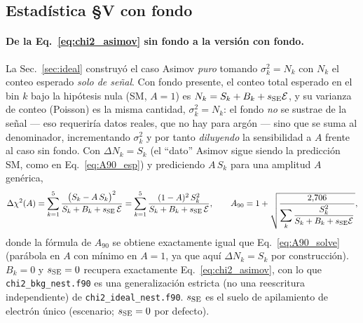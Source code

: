 \documentclass[11pt,a4paper]{article}
\newcommand{\code}[1]{\texttt{#1}}
\begin{document}
\subsection{Estad\'istica \S V con fondo}
\label{sec:ar_chi2}

\paragraph{De la Eq.~\eqref{eq:chi2_asimov} sin fondo a la versi\'on con fondo.}
La Sec.~\ref{sec:ideal} construy\'o el caso Asimov \emph{puro} tomando
$\sigma_{k}^{2}=N_{k}$ con $N_{k}$ el conteo esperado \emph{solo de se\~nal}. Con
fondo presente, el conteo total esperado en el bin $k$ bajo la hip\'otesis nula
(SM, $A=1$) es $N_{k}=S_{k}+B_{k}+s_{\rm SE}\mathcal{E}$, y su varianza de
conteo (Poisson) es la misma cantidad, $\sigma_{k}^{2}=N_{k}$: el fondo
\emph{no} se sustrae de la se\~nal --- eso requerir\'ia datos reales, que no hay
para arg\'on --- sino que se suma al denominador, incrementando $\sigma_{k}^{2}$
y por tanto \emph{diluyendo} la sensibilidad a $A$ frente al caso sin fondo. Con
$\Delta N_{k}=S_{k}$ (el ``dato'' Asimov sigue siendo la predicci\'on SM, como en
Eq.~\eqref{eq:A90_esp}) y prediciendo $A\,S_{k}$ para una amplitud $A$
gen\'erica,
\begin{equation}
  \label{eq:chi2_bkg}
  \Delta\chi^{2}(A)
  = \sum_{k=1}^{5}
    \frac{\bigl(S_{k}-A\,S_{k}\bigr)^{2}}{S_{k} + B_{k} + s_{\rm SE}\,\mathcal{E}}
  = \sum_{k=1}^{5}
    \frac{(1-A)^{2}\,S_{k}^{2}}{S_{k} + B_{k} + s_{\rm SE}\,\mathcal{E}},
  \qquad
  A_{90}
  = 1 + \sqrt{\dfrac{2{,}706}
    {\displaystyle\sum_{k} \dfrac{S_{k}^{2}}{S_{k}+B_{k}+s_{\rm SE}\mathcal{E}}}},
\end{equation}
donde la f\'ormula de $A_{90}$ se obtiene exactamente igual que
Eq.~\eqref{eq:A90_solve} (par\'abola en $A$ con m\'inimo en $A=1$, ya que aqu\'i
$\Delta N_k=S_k$ por construcci\'on). $B_{k}=0$ y $s_{\rm SE}=0$ recupera
exactamente Eq.~\eqref{eq:chi2_asimov}, con lo que \code{chi2\_bkg\_nest.f90} es
una generalizaci\'on estricta (no una reescritura independiente) de
\code{chi2\_ideal\_nest.f90}. $s_{\rm SE}$ es el suelo de apilamiento de
electr\'on \'unico (escenario; $s_{\rm SE}=0$ por defecto).
\end{document}
